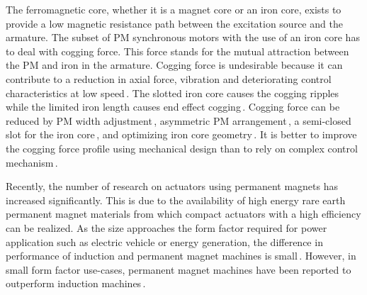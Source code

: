         
        The ferromagnetic core, whether it is a magnet core or an iron core, exists to provide a low magnetic resistance path between the excitation source and the armature. The subset of \ac{PM} synchronous motors with the use of an iron core has to deal with cogging force. This force stands for the mutual attraction between the PM and iron in the armature. Cogging force is undesirable because it can contribute to a reduction in axial force, vibration and deteriorating control characteristics at low speed\,\cite{Jung1999}. The slotted iron core causes the cogging ripples while the limited iron length causes end effect cogging\,\cite{Lim2002}. Cogging force can be reduced by PM width adjustment\,\cite{Bianchi2002}, asymmetric PM arrangement\,\cite{Chung2016,Bianchi2003a,Cai2012}, a semi-closed slot for the iron core\,\cite{Zhu1997,Bai2015,Zhu2008}, and optimizing iron core geometry\,\cite{Inoue2000,Zhu1997,Wu2008,Zhu2009conf,Zhang2013,Kim2016,Lee2014}. It is better to improve the cogging force profile using mechanical design than to rely on complex control mechanism\,\cite{Jahn1996}. 
        
        
        Recently, the number of research on actuators using permanent magnets has increased significantly. This is due to the availability of high energy rare earth permanent magnet materials from which compact actuators with a high efficiency can be realized. As the size approaches the form factor required for power application such as electric vehicle or energy generation, the difference in performance of induction and permanent magnet machines is small\,\cite{WoosukSung2012Energy-EfficientVehicles,2014Almeida,Chau2008OverviewVehicles,deSantiago2012ElectricalReview}. However, in small form factor use-cases, permanent magnet machines have been reported to outperform induction machines\,\cite{Zhu2007ElectricalVehicles,Yang2015ComparativeApplications}. 
        
